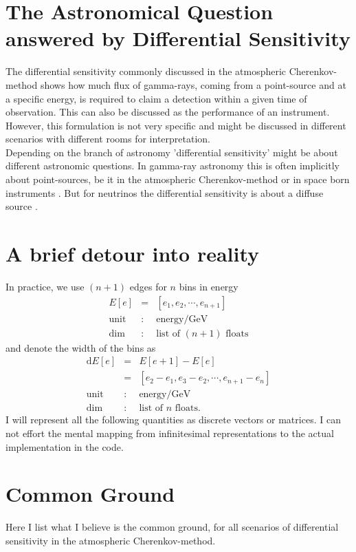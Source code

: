 \documentclass{article}%
\begin{document}
\section{The Astronomical Question answered by Differential Sensitivity}
\label{SecAstronomicalQuastion}
The differential sensitivity commonly discussed in the atmospheric Cherenkov-method shows how much flux of gamma-rays, coming from a point-source and at a specific energy, is required to claim a detection within a given time of observation.
%
This can also be discussed as the performance of an instrument.
%
\\
%
However, this formulation is not very specific and might be discussed in different scenarios with different rooms for interpretation.
%
\\
%
Depending on the branch of astronomy 'differential sensitivity' might be about different astronomic questions.
%
In gamma-ray astronomy this is often implicitly about point-sources, be it in the atmospheric Cherenkov-method \cite{cta2018baseline,cortina2016machete} or in space born instruments \cite{wood2016fermiperformance}.
%
But for neutrinos the differential sensitivity is about a diffuse source \cite{marinelli2021km3netarca}.
%
\section{A brief detour into reality}
%
In practice, we use $(n+1)$ edges for $n$ bins in energy
%
\begin{eqnarray*}
E[e] &=& [e_1, e_2, \cdots, e_{n+1}]\\
\text{unit} &:& \text{energy} / \text{GeV}\\
\text{dim} &:& \text{list of}\,\,(n + 1)\,\,\text{floats}
\end{eqnarray*}
%
and denote the width of the bins as
%
\begin{eqnarray*}
\text{d}E[e] &=& E[e+1] - E[e]\\
&=& [e_2-e_1, e_3-e_2, \cdots, e_{n+1}-e_n]\\
\text{unit} &:& \text{energy} / \text{GeV}\\
\text{dim} &:& \text{list of}\,\,n\,\,\text{floats}.
\end{eqnarray*}
%
I will represent all the following quantities as discrete vectors or matrices.
%
I can not effort the mental mapping from infinitesimal representations to the actual implementation in the code.
%
\section{Common Ground}
\label{SecCommonGround}
%
Here I list what I believe is the common ground, for all scenarios of differential sensitivity in the atmospheric Cherenkov-method.
%
\end{document}
